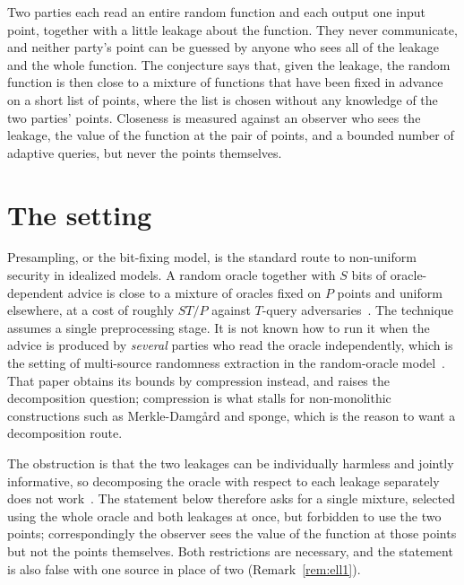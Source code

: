 \documentclass{conjura-conjecture}
\begin{document}

\vspace{0.4em}

\begin{informalconjecture}
Two parties each read an entire random function and each output one input
point, together with a little leakage about the function. They never
communicate, and neither party's point can be guessed by anyone who sees
all of the leakage and the whole function. The conjecture says that, given
the leakage, the random function is then close to a mixture of functions
that have been fixed in advance on a short list of points, where the list
is chosen without any knowledge of the two parties' points. Closeness is
measured against an observer who sees the leakage, the value of the
function at the pair of points, and a bounded number of adaptive queries,
but never the points themselves.
\end{informalconjecture}

\section{The setting}\label{sec:setting}

Presampling, or the bit-fixing model, is the standard route to non-uniform
security in idealized models. A random oracle together with $S$ bits of
oracle-dependent advice is close to a mixture of oracles fixed on $P$
points and uniform elsewhere, at a cost of roughly $ST/P$ against
$T$-query adversaries~\cite{Unruh,DGK,CDGS}. The technique assumes a
single preprocessing stage. It is not known how to run it when the advice
is produced by \emph{several} parties who read the oracle independently,
which is the setting of multi-source randomness extraction in the
random-oracle model~\cite{CFHS}. That paper obtains its bounds by
compression instead, and raises the decomposition question; compression is
what stalls for non-monolithic constructions such as Merkle-Damg\aa{}rd
and sponge, which is the reason to want a decomposition route.

The obstruction is that the two leakages can be individually harmless and
jointly informative, so decomposing the oracle with respect to each
leakage separately does not work~\cite[\S1.4]{CFHS}. The statement below
therefore asks for a single mixture, selected using the whole oracle and
both leakages at once, but forbidden to use the two points; correspondingly
the observer sees the value of the function at those points but not the
points themselves. Both restrictions are necessary, and the statement is
also false with one source in place of two (Remark~\ref{rem:ell1}).
\end{document}
